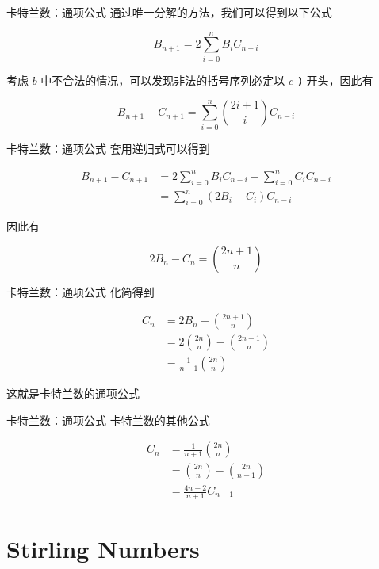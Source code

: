\documentclass[12pt,aspectratio=169]{beamer}
\begin{document}
\begin{frame}[fragile]{卡特兰数：通项公式}
  通过唯一分解的方法，我们可以得到以下公式

  $$
  B_{n+1} = 2 \sum_{i=0}^{n}B_{i}C_{n-i}
  $$

  考虑 $b$ 中不合法的情况，可以发现非法的括号序列必定以 $c$ \verb|)| 开头，因此有

  $$
  B_{n+1} - C_{n+1} = \sum_{i=0}^{n} {2i+1 \choose i} C_{n-i}
  $$
\end{frame}

\begin{frame}[fragile]{卡特兰数：通项公式}
  套用递归式可以得到

  $$
  \begin{aligned}
  B_{n+1} - C_{n+1} &= 2 \sum_{i=0}^{n} B_{i} C_{n-i} - \sum_{i=0}^n C_{i} C_{n-i} \\
  &= \sum_{i=0}^{n} (2 B_{i} - C_{i}) C_{n-i}
  \end{aligned}
  $$

  因此有

  $$
  2 B_{n} - C_{n} = {2n+1 \choose n}
  $$
\end{frame}

\begin{frame}[fragile]{卡特兰数：通项公式}
  化简得到

  $$
  \begin{aligned}
  C_{n} &= 2 B_{n} - {2n+1 \choose n} \\
  &= 2 {2n \choose n} - {2n+1 \choose n} \\
  &= \frac{1}{n+1} {2n \choose n}
  \end{aligned}
  $$

  这就是卡特兰数的通项公式
\end{frame}

\begin{frame}[fragile]{卡特兰数：通项公式}
  卡特兰数的其他公式

  $$
  \begin{aligned}
  C_{n} &= \frac{1}{n+1} {2n \choose n} \\
  &= {2n \choose n} - {2n \choose n - 1} \\
  &= \frac{4n-2}{n+1} C_{n-1}
  \end{aligned}
  $$
\end{frame}

\section[斯特林数]{Stirling Numbers}
\end{document}
